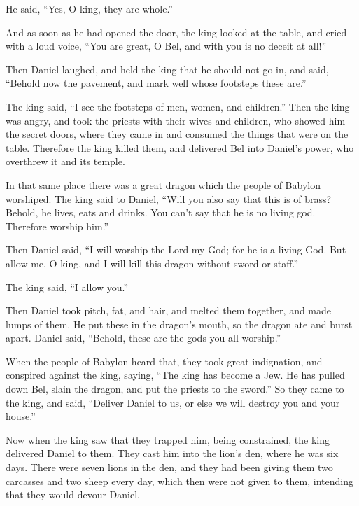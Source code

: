 He said, ``Yes, O king, they are whole.''

 And as soon as he had opened the door, the king looked at
the table, and cried with a loud voice, ``You are great, O Bel, and with
you is no deceit at all!''

 Then Daniel laughed, and held the king that he should not
go in, and said, ``Behold now the pavement, and mark well whose
footsteps these are.''

 The king said, ``I see the footsteps of men, women, and
children.'' Then the king was angry,  and took the priests
with their wives and children, who showed him the secret doors, where
they came in and consumed the things that were on the table.
 Therefore the king killed them, and delivered Bel into
Daniel's power, who overthrew it and its temple.

 In that same place there was a great dragon which the
people of Babylon worshiped.  The king said to Daniel,
``Will you also say that this is of brass? Behold, he lives, eats and
drinks. You can't say that he is no living god. Therefore worship him.''

 Then Daniel said, ``I will worship the Lord my God; for he
is a living God.  But allow me, O king, and I will kill
this dragon without sword or staff.''

The king said, ``I allow you.''

 Then Daniel took pitch, fat, and hair, and melted them
together, and made lumps of them. He put these in the dragon's mouth, so
the dragon ate and burst apart. Daniel said, ``Behold, these are the
gods you all worship.''

 When the people of Babylon heard that, they took great
indignation, and conspired against the king, saying, ``The king has
become a Jew. He has pulled down Bel, slain the dragon, and put the
priests to the sword.''  So they came to the king, and
said, ``Deliver Daniel to us, or else we will destroy you and your
house.''

 Now when the king saw that they trapped him, being
constrained, the king delivered Daniel to them.  They cast
him into the lion's den, where he was six days.  There were
seven lions in the den, and they had been giving them two carcasses and
two sheep every day, which then were not given to them, intending that
they would devour Daniel.

